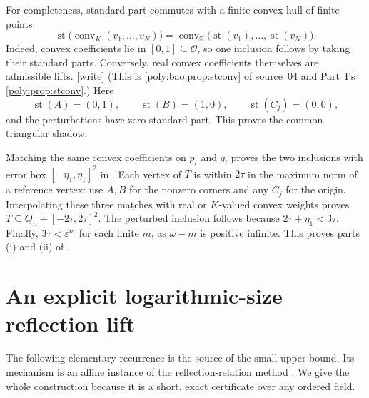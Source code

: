 \documentclass[11pt,a4paper]{article}
\numberwithin{equation}{section}
\theoremstyle{plain}
\newcommand{\wtag}{\textup{[write]}}%
\newcommand{\R}{\mathbb R}
\newcommand{\eps}{\varepsilon}
\newcommand{\st}{\operatorname{st}}
\newcommand{\conv}{\operatorname{conv}}
\newcommand{\OO}{\mathcal O}
\newcommand{\boxrad}[1]{[-#1,#1]^2}
\begin{document}
For completeness, standard part commutes with a finite convex hull of
finite points:
\begin{equation}\label{poly:ic:eq:shadowhull}
 \st\bigl(\conv_K(v_1,\ldots,v_N)\bigr)
     =\conv_\R\bigl(\st(v_1),\ldots,\st(v_N)\bigr).
\end{equation}
Indeed, convex coefficients lie in $[0,1]\subseteq\OO$, so one inclusion
follows by taking their standard parts. Conversely, real convex
coefficients themselves are admissible lifts.
\wtag{} (This is \cref{poly:bao:prop:stconv} of source~04 and Part~I's
\cref{poly:prop:stconv}.)
Here
\[
 \st(A)=(0,1),\qquad \st(B)=(1,0),\qquad \st(C_j)=(0,0),
\]
and the perturbations have zero standard part. This proves the common
triangular shadow.

Matching the same convex coefficients on $p_i$ and $q_i$ proves the two
inclusions with error box $\boxrad{\eta_1}$ in .
Each vertex of $T$ is within $2\tau$ in the maximum norm of a reference
vertex: use $A,B$ for the nonzero corners and any $C_j$ for the origin.
Interpolating these three matches with real or $K$-valued convex weights
proves $T\subseteq Q_n+\boxrad{2\tau}$. The perturbed inclusion follows
because $2\tau+\eta_1<3\tau$. Finally, $3\tau<\eps^m$ for each finite $m$,
as $\omega-m$ is positive infinite. This proves parts (i) and (ii) of
.

\section{An explicit logarithmic-size reflection lift}\label{poly:ic:sec:easy}

The following elementary recurrence is the source of the small upper bound.
Its mechanism is an affine instance of the reflection-relation method
\cite{ic:kp}. We give the whole construction because it is a short, exact
certificate over any ordered field.
\end{document}
